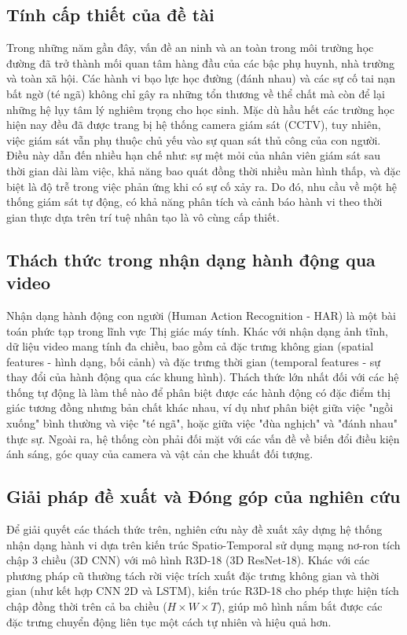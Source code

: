 \documentclass[conference]{IEEEtran}
\begin{document}
\subsection{Tính cấp thiết của đề tài}
Trong những năm gần đây, vấn đề an ninh và an toàn trong môi trường học đường đã trở thành mối quan tâm hàng đầu của các bậc phụ huynh, nhà trường và toàn xã hội. Các hành vi bạo lực học đường (đánh nhau) và các sự cố tai nạn bất ngờ (té ngã) không chỉ gây ra những tổn thương về thể chất mà còn để lại những hệ lụy tâm lý nghiêm trọng cho học sinh. Mặc dù hầu hết các trường học hiện nay đều đã được trang bị hệ thống camera giám sát (CCTV), tuy nhiên, việc giám sát vẫn phụ thuộc chủ yếu vào sự quan sát thủ công của con người. Điều này dẫn đến nhiều hạn chế như: sự mệt mỏi của nhân viên giám sát sau thời gian dài làm việc, khả năng bao quát đồng thời nhiều màn hình thấp, và đặc biệt là độ trễ trong việc phản ứng khi có sự cố xảy ra. Do đó, nhu cầu về một hệ thống giám sát tự động, có khả năng phân tích và cảnh báo hành vi theo thời gian thực dựa trên trí tuệ nhân tạo là vô cùng cấp thiết.

\subsection{Thách thức trong nhận dạng hành động qua video}
Nhận dạng hành động con người (Human Action Recognition - HAR) là một bài toán phức tạp trong lĩnh vực Thị giác máy tính. Khác với nhận dạng ảnh tĩnh, dữ liệu video mang tính đa chiều, bao gồm cả đặc trưng không gian (spatial features - hình dạng, bối cảnh) và đặc trưng thời gian (temporal features - sự thay đổi của hành động qua các khung hình). Thách thức lớn nhất đối với các hệ thống tự động là làm thế nào để phân biệt được các hành động có đặc điểm thị giác tương đồng nhưng bản chất khác nhau, ví dụ như phân biệt giữa việc "ngồi xuống" bình thường và việc "té ngã", hoặc giữa việc "đùa nghịch" và "đánh nhau" thực sự. Ngoài ra, hệ thống còn phải đối mặt với các vấn đề về biến đổi điều kiện ánh sáng, góc quay của camera và vật cản che khuất đối tượng.

\subsection{Giải pháp đề xuất và Đóng góp của nghiên cứu}
Để giải quyết các thách thức trên, nghiên cứu này đề xuất xây dựng hệ thống nhận dạng hành vi dựa trên kiến trúc Spatio-Temporal sử dụng mạng nơ-ron tích chập 3 chiều (3D CNN) với mô hình R3D-18 (3D ResNet-18). Khác với các phương pháp cũ thường tách rời việc trích xuất đặc trưng không gian và thời gian (như kết hợp CNN 2D và LSTM), kiến trúc R3D-18 cho phép thực hiện tích chập đồng thời trên cả ba chiều ($H \times W \times T$), giúp mô hình nắm bắt được các đặc trưng chuyển động liên tục một cách tự nhiên và hiệu quả hơn.
\end{document}

